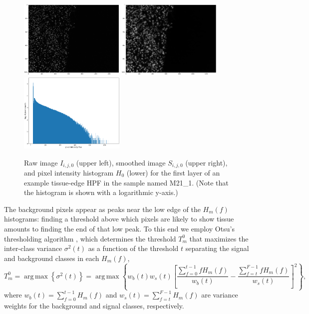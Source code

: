 \documentclass[letterpaper,11pt]{article}
\DeclareMathOperator*{\argmax}{arg\,max}
\begin{document}
\begin{figure}[!ht]
\centering
\includegraphics[width=0.45\textwidth]{images/masking/example_raw_image}
\includegraphics[width=0.45\textwidth]{images/masking/example_smoothed_image}
\includegraphics[width=0.45\textwidth]{images/masking/example_histogram}
\caption{\footnotesize Raw image $I_{i,j,0}$ (upper left), smoothed image $S_{i,j,0}$ (upper right), and pixel intensity histogram $H_{0}$ (lower) for the first layer of an example tissue-edge HPF in the sample named M21\_1. (Note that the histogram is shown with a logarithmic y-axis.)}
\label{fig:raw_to_smoothed_to_histogram}
\end{figure}

The background pixels appear as peaks near the low edge of the $H_{m}(f)$ histograms: finding a threshold above which pixels are likely to show tissue amounts to finding the end of that low peak. To this end we employ Otsu's thresholding algorithm \cite{4310076}, which determines the threshold $T^{0}_{m}$ that maximizes the inter-class variance $\sigma^2(t)$ as a function of the threshold $t$ separating the signal and background classes in each $H_{m}(f)$,
\begin{equation}
T^{0}_{m} = \argmax{ \left\{ \sigma^2(t) \right\} } = \argmax{ \left\{ w_{b}(t) w_{s}(t) \left[ \frac{\sum_{f=0}^{t-1} f H_{m}(f)}{w_{b}(t)} - \frac{\sum_{f=t}^{F-1} f H_{m}(f)}{w_{s}(t)} \right]^2 \right\} },
\label{eq:otsu_threshold_def}
\end{equation}  
where $w_{b}(t) = \sum_{f=0}^{t-1} H_{m}(f)$ and $w_{s}(t) = \sum_{f=t}^{F-1} H_{m}(f)$ are variance weights for the background and signal classes, respectively.
\end{document}
